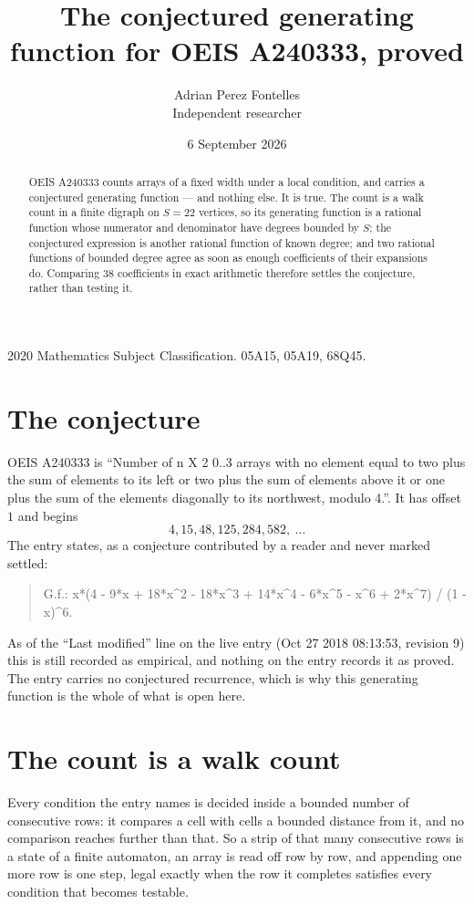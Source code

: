 \documentclass[11pt,a4paper]{article}
\title{The conjectured generating function for OEIS A240333, proved}
\author{Adrian Perez Fontelles\\ \small Independent researcher}
\date{6 September 2026}
\theoremstyle{plain}
\theoremstyle{definition}
\begin{document}
\maketitle

\begin{abstract}
OEIS A240333 counts arrays of a fixed width under a local condition, and carries a conjectured
generating function --- and nothing else. It is true. The count is a walk count in a finite
digraph on $S=22$ vertices, so its generating function is a rational function whose numerator
and denominator have degrees bounded by $S$; the conjectured expression is another rational
function of known degree; and two rational functions of bounded degree agree as soon as enough
coefficients of their expansions do. Comparing $38$ coefficients in exact arithmetic
therefore settles the conjecture, rather than testing it.
\end{abstract}

\noindent\small 2020 Mathematics Subject Classification. 05A15, 05A19, 68Q45.\normalsize

\section{The conjecture}

OEIS A240333 is ``Number of n X 2 0..3 arrays with no element equal to two plus the sum of elements to its left or two plus the sum of elements above it or one plus the sum of the elements diagonally to its northwest, modulo 4.''. It has offset $1$ and begins
\[
4, 15, 48, 125, 284, 582,\ \dots
\]
The entry states, as a conjecture contributed by a reader and never marked settled:
\begin{quote}
G.f.: x*(4 - 9*x + 18*x\^{}2 - 18*x\^{}3 + 14*x\^{}4 - 6*x\^{}5 - x\^{}6 + 2*x\^{}7) / (1 - x)\^{}6.
\end{quote}
As of the ``Last modified'' line on the live entry (Oct 27 2018 08:13:53, revision 9) this is still
recorded as empirical, and nothing on the entry records it as proved. The entry carries no
conjectured recurrence, which is why this generating function is the whole of what is open
here.

\section{The count is a walk count}

Every condition the entry names is decided inside a bounded number of consecutive rows: it
compares a cell with cells a bounded distance from it, and no comparison reaches further than
that. So a strip of that many consecutive rows is a state of a finite automaton, an array is
read off row by row, and appending one more row is one step, legal exactly when the row it
completes satisfies every condition that becomes testable.
\end{document}
